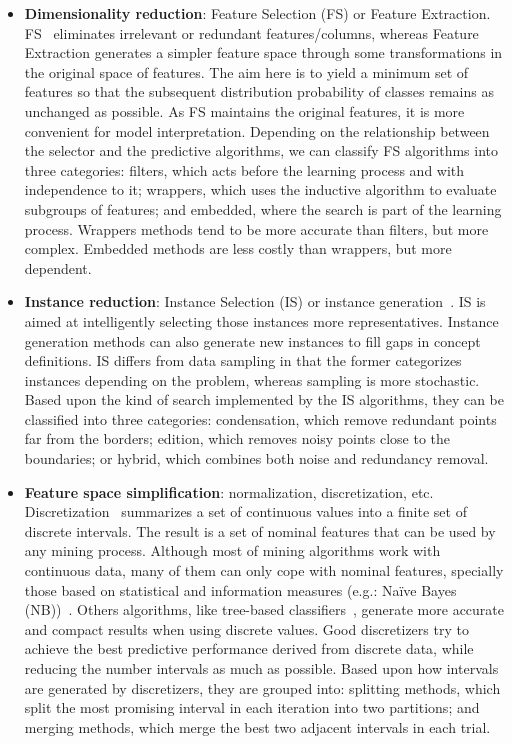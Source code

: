 \documentclass[preprint,12pt]{elsarticle}
\begin{document}
\begin{itemize}
	\item \textbf{Dimensionality reduction}: Feature Selection (FS) or Feature Extraction. FS~\cite{doquire12} eliminates irrelevant or redundant features/columns, whereas Feature Extraction generates a simpler feature space through some transformations in the original space of features. The aim here is to yield a minimum set of features so that the subsequent distribution probability of classes remains as unchanged as possible. As FS maintains the original features, it is more convenient for model interpretation. Depending on the relationship between the selector and the predictive algorithms, we can classify FS algorithms into three categories: filters, which acts before the learning process and with independence to it; wrappers, which uses the inductive algorithm to evaluate subgroups of features; and embedded, where the search is part of the learning process. Wrappers methods tend to be more accurate than filters, but more complex. Embedded methods are less costly than wrappers, but more dependent.
	\item \textbf{Instance reduction}: Instance Selection (IS) or instance generation~\cite{lopez14}. IS is aimed at intelligently selecting those instances more representatives. Instance generation methods can also generate new instances to fill gaps in concept definitions. IS differs from data sampling in that the former categorizes instances depending on the problem, whereas sampling is more stochastic. Based upon the kind of search implemented by the IS algorithms, they can be classified into three categories: condensation, which remove redundant points far from the borders; edition, which removes noisy points close to the boundaries; or hybrid, which combines both noise and redundancy removal.
	\item \textbf{Feature space simplification}: normalization, discretization, etc. Discretization~\cite{ferreira14} summarizes a set of continuous values into a finite set of discrete intervals. The result is a set of nominal features that can be used by any mining process. Although most of mining algorithms work with continuous data, many of them can only cope with nominal features, specially those based on statistical and information measures (e.g.: Na\"ive Bayes (NB))~\cite{yang09}. Others algorithms, like tree-based classifiers~\cite{hu09}, generate more accurate and compact results when using discrete values. Good discretizers try to achieve the best predictive performance derived from discrete data, while reducing the number intervals as much as possible. Based upon how intervals are generated by discretizers, they are grouped into: splitting methods, which split the most promising interval in each iteration into two partitions; and merging methods, which merge the best two adjacent intervals in each trial.
\end{itemize}
\end{document}
